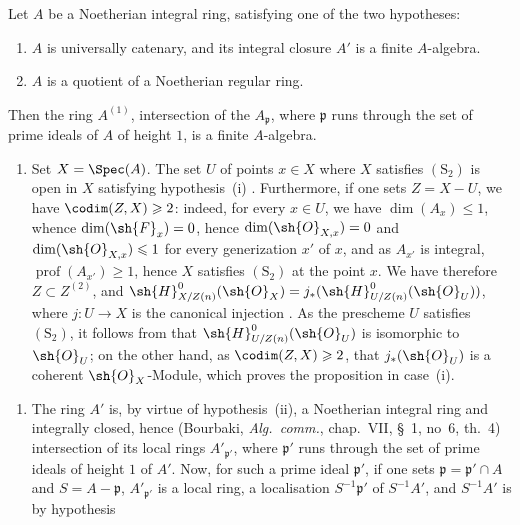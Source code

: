 \begin{corollary}[5.11.2]
\label{IV.5.11.2}
Let $A$ be a Noetherian integral ring, satisfying one of the two hypotheses:
\begin{enumerate}
  \item[\rm(i)] $A$ is universally catenary, and its integral closure $A'$ is a finite $A$-algebra.
  \item[\rm(ii)] $A$ is a quotient of a Noetherian regular ring.
\end{enumerate}
Then the ring $A^{(1)}$, intersection of the $A_\mathfrak{p}$, where $\mathfrak{p}$ runs through the set of prime ideals of $A$ of height $1$, is a finite $A$-algebra.
\begin{enumerate}
  \item[\rm(i)] Set $X=\Spec(A)$.
The set $U$ of points $x\in X$ where $X$ satisfies $(\mathrm{S}_2)$ is open in $X$ satisfying hypothesis~(i) .
Furthermore, if one sets $Z=X-U$, we have $\codim(Z,X)\geqslant 2$: indeed, for every $x\in U$, we have $\dim(A_x)\leqslant 1$, whence $\dim(\sh{F}_x)=0$, hence $\dim(\sh{O}_{X,x})=0$ and $\dim(\sh{O}_{X,x})\leqslant 1$ for every generization $x'$ of $x$, and as $A_{x'}$ is integral, $\operatorname{prof}(A_{x'})\geqslant 1$, hence $X$ satisfies $(\mathrm{S}_2)$ at the point $x$.
We have therefore $Z\subset Z^{(2)}$, and $\sh{H}^0_{X/Z(n)}(\sh{O}_X)=j_*(\sh{H}^0_{U/Z(n)}(\sh{O}_U))$, where $j:U\to X$ is the canonical injection .
As the prescheme $U$ satisfies $(\mathrm{S}_2)$, it follows from  that $\sh{H}^0_{U/Z(n)}(\sh{O}_U)$ is isomorphic to $\sh{O}_U$; on the other hand, as $\codim(Z,X)\geqslant 2$, that $j_*(\sh{O}_U)$ is a coherent $\sh{O}_X$-Module, which proves the proposition in case~(i).
\end{enumerate}


\begin{enumerate}
  \item[\rm(ii)] The ring $A'$ is, by virtue of hypothesis~(ii), a Noetherian integral ring and integrally closed, hence (Bourbaki, \emph{Alg.\ comm.}, chap.~VII, \S~1, no~6, th.~4) intersection of its local rings $A'_{\mathfrak{p}'}$, where $\mathfrak{p}'$ runs through the set of prime ideals of height $1$ of $A'$.
Now, for such a prime ideal $\mathfrak{p}'$, if one sets $\mathfrak{p}=\mathfrak{p}'\cap A$ and $S=A-\mathfrak{p}$, $A'_{\mathfrak{p}'}$ is a local ring, a localisation $S^{-1}\mathfrak{p}'$ of $S^{-1}A'$, and $S^{-1}A'$ is by hypothesis
\end{enumerate}


\end{corollary}
